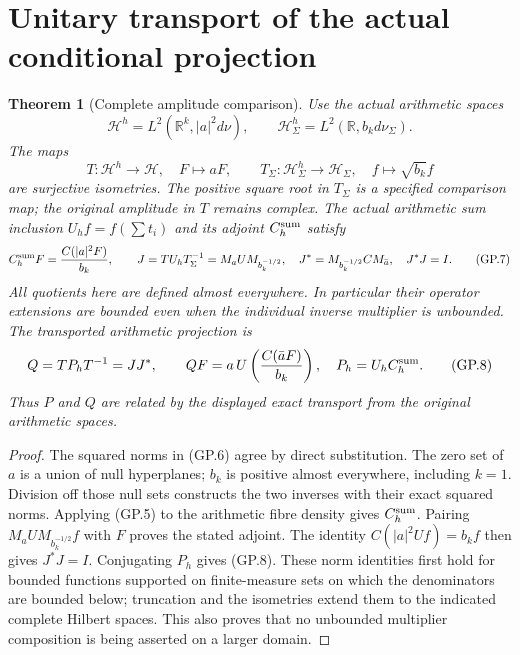 \documentclass[11pt]{article}
\newtheorem{theorem}{Theorem}
\newcommand{\R}{\mathbb R}
\newcommand{\HH}{\mathcal H}
\begin{document}
\section{Unitary transport of the actual conditional projection}
\begin{theorem}[Complete amplitude comparison]
Use the actual arithmetic spaces
\[
 \HH^h=L^2(\R^k,|a|^2d\nu),\qquad
 \HH^h_\Sigma=L^2(\R,b_kd\nu_\Sigma).
\]
The maps
\begin{equation}
 T:\HH^h\longrightarrow\HH,\quad F\longmapsto aF,
 \qquad T_\Sigma:\HH^h_\Sigma\longrightarrow\HH_\Sigma,
       \quad f\longmapsto\sqrt{b_k}f
 \tag{GP.6}
\end{equation}
are surjective isometries. The positive square root in $T_\Sigma$
is a specified comparison map; the original amplitude in $T$ remains
complex. The actual arithmetic sum inclusion $U_hf=f(\sum t_i)$
and its adjoint $C_h^{\rm sum}$ satisfy
\begin{equation}
 C_h^{\rm sum}F=\frac{C(|a|^2F)}{b_k},\qquad
 J=TU_hT_\Sigma^{-1}=M_aUM_{b_k^{-1/2}},\quad
 J^*=M_{b_k^{-1/2}}CM_{\bar a},\quad J^*J=I.
 \tag{GP.7}
\end{equation}
All quotients here are defined almost everywhere. In particular their
operator extensions are bounded even when the individual inverse
multiplier is unbounded. The transported arithmetic projection is
\begin{equation}
 Q=TP_hT^{-1}=JJ^*,\qquad
 QF=a\,U\left(\frac{C(\bar a F)}{b_k}\right),
 \quad P_h=U_hC_h^{\rm sum}.
 \tag{GP.8}
\end{equation}
Thus $P$ and $Q$ are related by the displayed exact transport from
the original arithmetic spaces.
\end{theorem}
\begin{proof}
The squared norms in (GP.6) agree by direct substitution. The zero set
of $a$ is a union of null hyperplanes; $b_k$ is positive almost
everywhere, including $k=1$. Division off those null sets constructs
the two inverses with their exact squared norms. Applying (GP.5) to
the arithmetic fibre density gives $C_h^{\rm sum}$. Pairing
$M_aUM_{b_k^{-1/2}}f$ with $F$ proves the stated adjoint. The identity
$C(|a|^2Uf)=b_kf$ then gives $J^*J=I$. Conjugating $P_h$ gives
(GP.8). These norm identities first hold for bounded functions
supported on finite-measure sets on which the denominators are
bounded below; truncation and the isometries extend them to the
indicated complete Hilbert spaces. This also proves that no unbounded
multiplier composition is being asserted on a larger domain.
\end{proof}
\end{document}
